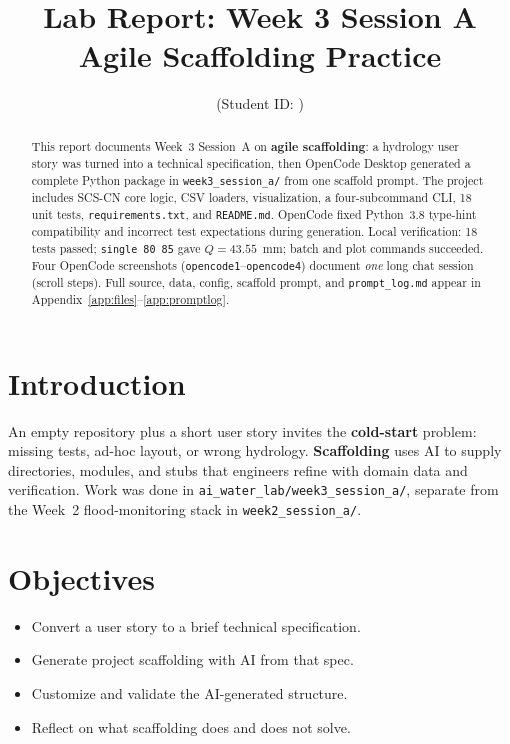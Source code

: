 \documentclass[11pt,a4paper]{article}
\title{Lab Report: Week 3 Session A\\Agile Scaffolding Practice}
\author{\studentname \quad (Student ID: \studentid)}
\date{\reportdate}
\begin{document}
\maketitle

\begin{abstract}
This report documents Week~3 Session~A on \textbf{agile scaffolding}: a hydrology user story was turned into a technical specification, then OpenCode Desktop generated a complete Python package in \texttt{week3\_session\_a/} from one scaffold prompt. The project includes SCS-CN core logic, CSV loaders, visualization, a four-subcommand CLI, 18 unit tests, \texttt{requirements.txt}, and \texttt{README.md}. OpenCode fixed Python~3.8 type-hint compatibility and incorrect test expectations during generation. Local verification: 18 tests passed; \texttt{single 80 85} gave $Q=43.55$~mm; batch and plot commands succeeded. Four OpenCode screenshots (\texttt{opencode1}--\texttt{opencode4}) document \emph{one} long chat session (scroll steps). Full source, data, config, scaffold prompt, and \texttt{prompt\_log.md} appear in Appendix~\ref{app:files}--\ref{app:promptlog}.
\end{abstract}

\section{Introduction}
An empty repository plus a short user story invites the \textbf{cold-start} problem: missing tests, ad-hoc layout, or wrong hydrology. \textbf{Scaffolding} uses AI to supply directories, modules, and stubs that engineers refine with domain data and verification. Work was done in \texttt{ai\_water\_lab/week3\_session\_a/}, separate from the Week~2 flood-monitoring stack in \texttt{week2\_session\_a/}.

\section{Objectives}
\begin{itemize}[noitemsep]
  \item Convert a user story to a brief technical specification.
  \item Generate project scaffolding with AI from that spec.
  \item Customize and validate the AI-generated structure.
  \item Reflect on what scaffolding does and does not solve.
\end{itemize}
\end{document}

